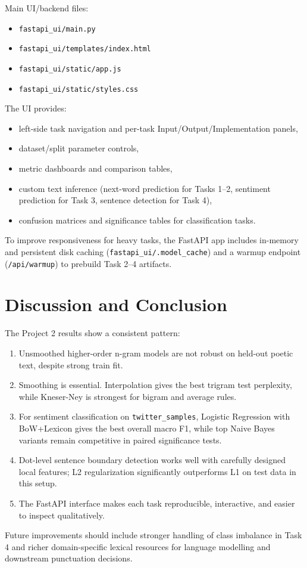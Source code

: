 \documentclass[10pt,a4paper]{article}
\begin{document}
Main UI/backend files:
\begin{itemize}
    \item \texttt{fastapi\_ui/main.py}
    \item \texttt{fastapi\_ui/templates/index.html}
    \item \texttt{fastapi\_ui/static/app.js}
    \item \texttt{fastapi\_ui/static/styles.css}
\end{itemize}

The UI provides:
\begin{itemize}
    \item left-side task navigation and per-task Input/Output/Implementation panels,
    \item dataset/split parameter controls,
    \item metric dashboards and comparison tables,
    \item custom text inference (next-word prediction for Tasks 1--2, sentiment prediction for Task 3, sentence detection for Task 4),
    \item confusion matrices and significance tables for classification tasks.
\end{itemize}

To improve responsiveness for heavy tasks, the FastAPI app includes in-memory and persistent disk caching (\texttt{fastapi\_ui/.model\_cache}) and a warmup endpoint (\texttt{/api/warmup}) to prebuild Task 2--4 artifacts.

\section{Discussion and Conclusion}

The Project 2 results show a consistent pattern:
\begin{enumerate}
    \item Unsmoothed higher-order n-gram models are not robust on held-out poetic text, despite strong train fit.
    \item Smoothing is essential. Interpolation gives the best trigram test perplexity, while Kneser-Ney is strongest for bigram and average rules.
    \item For sentiment classification on \texttt{twitter\_samples}, Logistic Regression with BoW+Lexicon gives the best overall macro F1, while top Naive Bayes variants remain competitive in paired significance tests.
    \item Dot-level sentence boundary detection works well with carefully designed local features; L2 regularization significantly outperforms L1 on test data in this setup.
    \item The FastAPI interface makes each task reproducible, interactive, and easier to inspect qualitatively.
\end{enumerate}

Future improvements should include stronger handling of class imbalance in Task 4 and richer domain-specific lexical resources for language modelling and downstream punctuation decisions.
\end{document}
